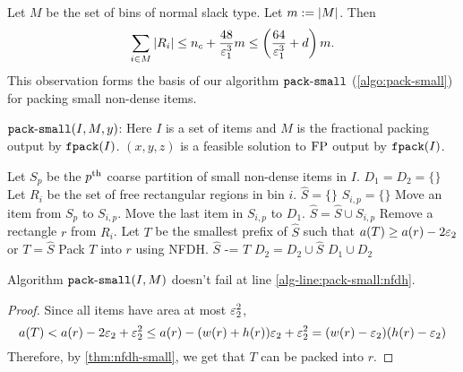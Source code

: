 Let $M$ be the set of bins of normal slack type. Let $m := |M|$. Then
\[ \sum_{i \in M} |R_i| \le n_c + \frac{48}{\varepsilon_1^3} m
\le \left(\frac{64}{\varepsilon_1^3} + d\right) m. \]
This observation forms the basis of our algorithm $\operatorname{\mathtt{pack-small}}$ (\cref{algo:pack-small})
for packing small non-dense items.

\begin{algorithm}[htb]
\caption{$\operatorname{\mathtt{pack-small}}(I, M, y)$:
Here $I$ is a set of items and $M$ is the fractional packing output by $\operatorname{\mathtt{fpack}}(I)$.
$(x, y, z)$ is a feasible solution to $\operatorname{FP}$ output by $\operatorname{\mathtt{fpack}}(I)$.}
\label{algo:pack-small}
\begin{algorithmic}[1]
\State Let $S_p$ be the $p^{\textrm{th}}$ coarse partition of small non-dense items in $I$.
\State $D_1 = D_2 = \{\}$  
    \State Let $R_i$ be the set of free rectangular regions in bin $i$.
    \State $\widehat{S} = \{\}$
        \State $S_{i,p} = \{\}$
            \State Move an item from $S_p$ to $S_{i,p}$.
        \EndWhile
         \label{alg-line:pack-small:select}
            \State Move the last item in $S_{i,p}$ to $D_1$.
        \EndIf
        \State $\widehat{S} = \widehat{S} \cup S_{i,p}$
    \EndFor
        \State Remove a rectangle $r$ from $R_i$.
        \State Let $T$ be the smallest prefix of $\widehat{S}$ such that
            $a(T) \ge a(r) - 2\varepsilon_2$ or $T = \widehat{S}$
        \State \label{alg-line:pack-small:nfdh}Pack $T$ into $r$ using NFDH.
        \State $\widehat{S} \texttt{ -= } T$
    \EndWhile
    \State $D_2 = D_2 \cup \widehat{S}$
\EndFor
\State \Return $D_1 \cup D_2$  
\end{algorithmic}
\end{algorithm}

\begin{lemma}
Algorithm $\operatorname{\mathtt{pack-small}}(I, M)$ doesn't fail at line \ref{alg-line:pack-small:nfdh}.
\end{lemma}
\begin{proof}
Since all items have area at most $\varepsilon_2^2$,
\[ a(T) < a(r) - 2\varepsilon_2 + \varepsilon_2^2
\le a(r) - (w(r) + h(r))\varepsilon_2 + \varepsilon_2^2
= (w(r) - \varepsilon_2)(h(r) - \varepsilon_2) \]
Therefore, by \cref{thm:nfdh-small}, we get that $T$ can be packed into $r$.
\end{proof}

